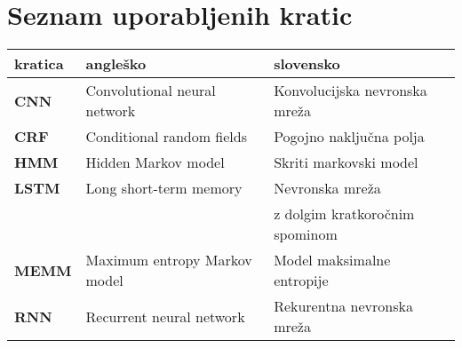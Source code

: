 \chapter*{Seznam uporabljenih kratic}

\begin{tabular}{l|l|l}
  {\bf kratica} & {\bf angleško} & {\bf slovensko} \\ \hline
  {\bf CNN} & Convolutional neural network & Konvolucijska nevronska mreža \\
  {\bf CRF} & Conditional random fields & Pogojno naključna polja \\
  {\bf HMM} & Hidden Markov model & Skriti markovski model \\
  {\bf LSTM} & Long short-term memory & Nevronska mreža \\
             &  &  z dolgim kratkoročnim spominom \\
  {\bf MEMM} & Maximum entropy Markov model & Model maksimalne entropije \\
  {\bf RNN} & Recurrent neural network & Rekurentna nevronska mreža \\
\end{tabular}
